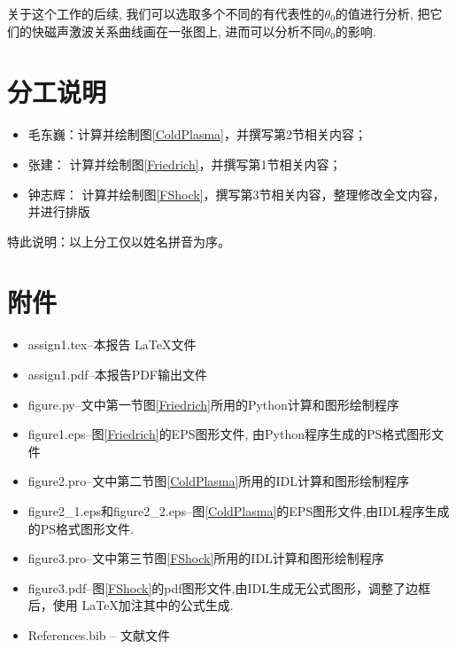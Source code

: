 \documentclass[landscape]{article}
\begin{document}
	关于这个工作的后续, 我们可以选取多个不同的有代表性的$\theta_0$的值进行分析, 把它们的快磁声激波关系曲线画在一张图上, 进而可以分析不同$\theta_0$的影响.

	\section{分工说明}
	
	\begin{itemize}
		\item 毛东巍：计算并绘制图\ref{ColdPlasma}，并撰写第2节相关内容；
		\item 张建： 计算并绘制图\ref{Friedrich}，并撰写第1节相关内容；
		\item 钟志辉： 计算并绘制图\ref{FShock}，撰写第3节相关内容，整理修改全文内容，并进行排版
	\end{itemize}
	特此说明：以上分工仅以姓名拼音为序。
	
	\section{附件}
	
	\begin{itemize}
		\item
		assign1.tex--本报告 \LaTeX 文件
		\item
		assign1.pdf--本报告PDF输出文件
		\item
		figure.py--文中第一节图\ref{Friedrich}所用的Python计算和图形绘制程序
		\item
		figure1.eps--图\ref{Friedrich}的EPS图形文件, 由Python程序生成的PS格式图形文件
		\item
		figure2.pro--文中第二节图\ref{ColdPlasma}所用的IDL计算和图形绘制程序
		\item
		figure2\_1.eps和figure2\_2.eps--图\ref{ColdPlasma}的EPS图形文件,由IDL程序生成的PS格式图形文件.
		\item
		figure3.pro--文中第三节图\ref{FShock}所用的IDL计算和图形绘制程序
		\item
		figure3.pdf--图\ref{FShock}的pdf图形文件,由IDL生成无公式图形，调整了边框后，使用
		\LaTeX 加注其中的公式生成.
		\item
		References.bib -- 文献文件
	\end{itemize}

	
	
	
	
\end{document}
